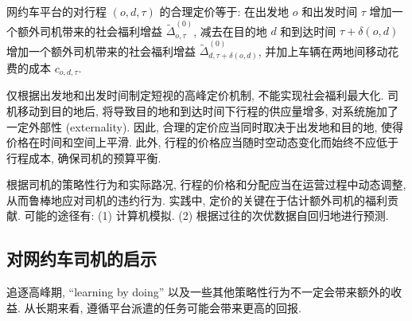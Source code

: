 \documentclass[10pt,twocolumn]{article}
\begin{document}
网约车平台的对行程 $(o,d,\tau)$ 的合理定价等于: 在出发地 $o$ 和出发时间 $\tau$ 增加一个额外司机带来的社会福利增益 $\tilde{\Delta}^{(0)}_{o,\tau}$, 减去在目的地 $d$ 和到达时间 $\tau+\delta(o,d)$ 增加一个额外司机带来的社会福利增益 $\tilde{\Delta}^{(0)}_{d,\tau+\delta(o,d)}$, 并加上车辆在两地间移动花费的成本 $c_{o,d,\tau}$.

仅根据出发地和出发时间制定短视的高峰定价机制, 不能实现社会福利最大化. 司机移动到目的地后, 将导致目的地和到达时间下行程的供应量增多, 对系统施加了一定外部性 (externality). 因此, 合理的定价应当同时取决于出发地和目的地, 使得价格在时间和空间上平滑. 此外, 行程的价格应当随时空动态变化而始终不应低于行程成本, 确保司机的预算平衡.

根据司机的策略性行为和实际路况, 行程的价格和分配应当在运营过程中动态调整, 从而鲁棒地应对司机的违约行为. 实践中, 定价的关键在于估计额外司机的福利贡献. 可能的途径有: (1) 计算机模拟. (2) 根据过往的次优数据自回归地进行预测.

\subsection{对网约车司机的启示}

追逐高峰期, “learning by doing” 以及一些其他策略性行为不一定会带来额外的收益. 从长期来看, 遵循平台派遣的任务可能会带来更高的回报.

\renewcommand{\refname}{参考文献}


\end{document}
